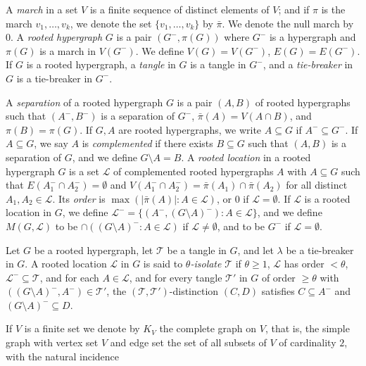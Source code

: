 A \textit{march} in a set $V$ is a finite sequence of distinct elements of $V$; and if $\pi$ is the march $v_1, \ldots, v_k$, we denote the set $\{v_1, \ldots, v_k\}$ by $\bar{\pi}$. We denote the null march by $0$. A \textit{rooted hypergraph} $G$ is a pair $(G^-, \pi(G))$ where $G^-$ is a hypergraph and $\pi(G)$ is a march in $V(G^-)$. We define $V(G) = V(G^-)$, $E(G) = E(G^-)$. If $G$ is a rooted hypergraph, a \textit{tangle} in $G$ is a tangle in $G^-$, and a \textit{tie-breaker} in $G$ is a tie-breaker in $G^-$.

A \textit{separation} of a rooted hypergraph $G$ is a pair $(A, B)$ of rooted hypergraphs such that $(A^-, B^-)$ is a separation of $G^-$, $\bar{\pi}(A) = V(A \cap B)$, and $\pi(B) = \pi(G)$. If $G, A$ are rooted hypergraphs, we write $A \subseteq G$ if $A^- \subseteq G^-$. If $A \subseteq G$, we say $A$ is \textit{complemented} if there exists $B \subseteq G$ such that $(A, B)$ is a separation of $G$, and we define $G \setminus A = B$. A \textit{rooted location} in a rooted hypergraph $G$ is a set $\mathcal{L}$ of complemented rooted hypergraphs $A$ with $A \subseteq G$ such that $E(A_1^- \cap A_2^-) = \emptyset$ and $V(A_1^- \cap A_2^-) = \bar{\pi}(A_1) \cap \bar{\pi}(A_2)$ for all distinct $A_1, A_2 \in \mathcal{L}$. Its \textit{order} is $\max(|\bar{\pi}(A)| : A \in \mathcal{L})$, or $0$ if $\mathcal{L} = \emptyset$. If $\mathcal{L}$ is a rooted location in $G$, we define $\mathcal{L}^- = \{(A^-, (G \setminus A)^-) : A \in \mathcal{L}\}$, and we define $M(G, \mathcal{L})$ to be $\cap((G \setminus A)^- : A \in \mathcal{L})$ if $\mathcal{L} \ne \emptyset$, and to be $G^-$ if $\mathcal{L} = \emptyset$.

Let $G$ be a rooted hypergraph, let $\mathcal{T}$ be a tangle in $G$, and let $\lambda$ be a tie-breaker in $G$. A rooted location $\mathcal{L}$ in $G$ is said to \textit{$\theta$-isolate} $\mathcal{T}$ if $\theta \ge 1$, $\mathcal{L}$ has order $< \theta$, $\mathcal{L}^- \subseteq \mathcal{T}$, and for each $A \in \mathcal{L}$, and for every tangle $\mathcal{T}'$ in $G$ of order $\ge \theta$ with $((G \setminus A)^-, A^-) \in \mathcal{T}'$, the $(\mathcal{T}, \mathcal{T}')$-distinction $(C, D)$ satisfies $C \subseteq A^-$ and $(G \setminus A)^- \subseteq D$.


If $V$ is a finite set we denote by $K_V$ the complete graph on $V$, that is, the simple graph with vertex set $V$ and edge set the set of all subsets of $V$ of cardinality $2$, with the natural incidence
